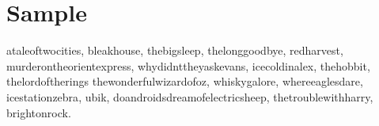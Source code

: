 \documentclass[12pt]{article}
\begin{document}
\section{Sample}

\gls{ataleoftwocities}, \gls{bleakhouse}, \gls{thebigsleep},
\gls{thelonggoodbye}, \gls{redharvest},
\gls{murderontheorientexpress}, \gls{whydidnttheyaskevans},
\gls{icecoldinalex}, \gls{thehobbit}, \gls{thelordoftherings}
\gls{thewonderfulwizardofoz}, \gls{whiskygalore},
\gls{whereeaglesdare}, \gls{icestationzebra}, \gls{ubik},
\gls{doandroidsdreamofelectricsheep}, \gls{thetroublewithharry},
\gls{brightonrock}.

\printunsrtglossary[title={Author and Book List}]
\end{document}

